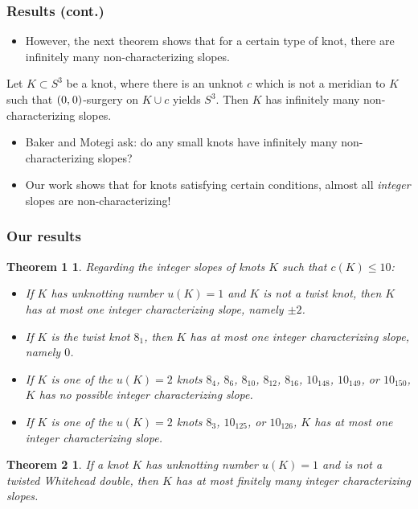 \documentclass{beamer}
\newcommand{\hs}{\hspace{0.05em}} %
\newtheorem{theorem1}[theorem]{Theorem 1}
\newtheorem{theorem2}[theorem]{Theorem 2}
\theoremstyle{ex}
\theoremstyle{rem}
\begin{document}
	\begin{frame}
		\frametitle{Results (cont.)}
		\begin{itemize}
			\item However, the next theorem shows that for a certain type of knot, there are infinitely many non-characterizing slopes.
		\end{itemize}
		\begin{theorem}
			Let $K\subset S^3$ be a knot, where there is an unknot $c$ which is not a meridian to $K$ such that $(0,\hs0)$-surgery on $K\cup c$ yields $S^3$. Then $K$ has infinitely many non-characterizing slopes.
		\end{theorem}
		\begin{itemize}
			\item Baker and Motegi ask: do any small knots have infinitely many non-characterizing slopes?
			\item Our work shows that for knots satisfying certain conditions, almost all \textit{integer} slopes are non-characterizing!
		\end{itemize}
	\end{frame}
	
	\begin{frame}
		\frametitle{Our results}
		\begin{theorem1}
			Regarding the integer slopes of knots $K$ such that $c(K) \leq 10$:
			\begin{itemize}
				\item If $K$ has unknotting number $u(K) = 1$ and $K$ is not a twist knot, then $K$ has at most \textit{one} integer characterizing slope, namely $\pm 2$.
				\item If $K$ is the twist knot $8_1$, then $K$ has at most \textit{one} integer characterizing slope, namely $0$.
				\item If $K$ is one of the $u(K) = 2$ knots $8_4$, $8_6$, $8_{10}$, $8_{12}$, $8_{16}$, $10_{148}$, $10_{149}$, or $10_{150}$, $K$ has no possible integer characterizing slope.
				\item If $K$ is one of the $u(K) = 2$ knots $8_3$, $10_{125}$, or $10_{126}$, $K$ has at most \textit{one} integer characterizing slope.
			\end{itemize}
		\end{theorem1}
		\begin{theorem2}
			If a knot $K$ has unknotting number $u(K)=1$ and is not a twisted Whitehead double, then $K$ has at most finitely many integer characterizing slopes.
		\end{theorem2}
	\end{frame}
	
\end{document}
